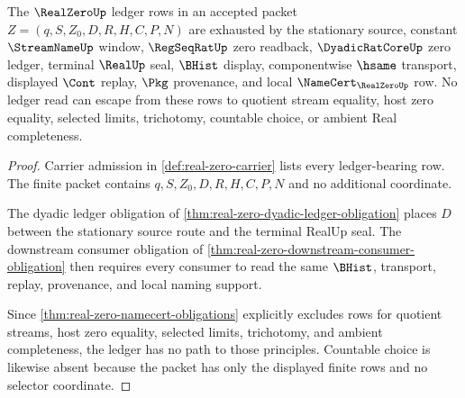 \begin{theorem}
\label{thm:real-zero-ledger-nonescape}
The $\RealZeroUp$ ledger rows in an accepted packet $Z=(q,S,Z_0,D,R,H,C,P,N)$ are exhausted by the stationary source, constant $\StreamNameUp$ window, $\RegSeqRatUp$ zero readback, $\DyadicRatCoreUp$ zero ledger, terminal $\RealUp$ seal, $\BHist$ display, componentwise $\hsame$ transport, displayed $\Cont$ replay, $\Pkg$ provenance, and local $\NameCert_{\RealZeroUp}$ row. No ledger read can escape from these rows to quotient stream equality, host zero equality, selected limits, trichotomy, countable choice, or ambient Real completeness.
\end{theorem}
\begin{proof}
Carrier admission in \autoref{def:real-zero-carrier} lists every ledger-bearing row. The finite packet contains $q,S,Z_0,D,R,H,C,P,N$ and no additional coordinate.

The dyadic ledger obligation of \autoref{thm:real-zero-dyadic-ledger-obligation} places $D$ between the stationary source route and the terminal RealUp seal. The downstream consumer obligation of \autoref{thm:real-zero-downstream-consumer-obligation} then requires every consumer to read the same $\BHist$, transport, replay, provenance, and local naming support.

Since \autoref{thm:real-zero-namecert-obligations} explicitly excludes rows for quotient streams, host zero equality, selected limits, trichotomy, and ambient completeness, the ledger has no path to those principles. Countable choice is likewise absent because the packet has only the displayed finite rows and no selector coordinate.
\end{proof}


\begin{closurestatus}{\RealZeroUp}
  \theoryclosure{\seedClosure}
  \formalstatus{\unformalizedV}
\end{closurestatus}
